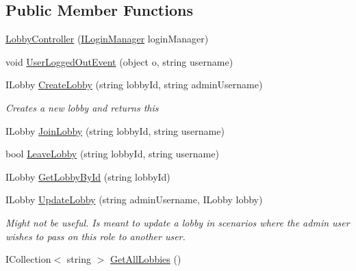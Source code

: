 \subsection*{Public Member Functions}
\begin{DoxyCompactItemize}
\item 
\mbox{\hyperlink{class_application_1_1_controllers_1_1_lobby_controller_a9c832739ad9b40794194b0f142279b6e}{Lobby\+Controller}} (\mbox{\hyperlink{interface_application_1_1_interfaces_1_1_i_login_manager}{I\+Login\+Manager}} login\+Manager)
\item 
void \mbox{\hyperlink{class_application_1_1_controllers_1_1_lobby_controller_a3b6eb2c76ba2d3d96ddec5c56ab2abc2}{User\+Logged\+Out\+Event}} (object o, string username)
\item 
I\+Lobby \mbox{\hyperlink{class_application_1_1_controllers_1_1_lobby_controller_ad0684f9eace44951fcb75c805fb8574c}{Create\+Lobby}} (string lobby\+Id, string admin\+Username)
\begin{DoxyCompactList}\small\item\em Creates a new lobby and returns this \end{DoxyCompactList}\item 
I\+Lobby \mbox{\hyperlink{class_application_1_1_controllers_1_1_lobby_controller_ac081cab03ea49323b57c294ca95c6a09}{Join\+Lobby}} (string lobby\+Id, string username)
\item 
bool \mbox{\hyperlink{class_application_1_1_controllers_1_1_lobby_controller_aa075018713d8ac7fdf84cf6349e2f10d}{Leave\+Lobby}} (string lobby\+Id, string username)
\item 
I\+Lobby \mbox{\hyperlink{class_application_1_1_controllers_1_1_lobby_controller_a5ea797c6456dc8d40e16b87077a16693}{Get\+Lobby\+By\+Id}} (string lobby\+Id)
\item 
I\+Lobby \mbox{\hyperlink{class_application_1_1_controllers_1_1_lobby_controller_a415b61b5c78ba52619ac4d3606ecc32e}{Update\+Lobby}} (string admin\+Username, I\+Lobby lobby)
\begin{DoxyCompactList}\small\item\em Might not be useful. Is meant to update a lobby in scenarios where the admin user wishes to pass on this role to another user. \end{DoxyCompactList}\item 
I\+Collection$<$ string $>$ \mbox{\hyperlink{class_application_1_1_controllers_1_1_lobby_controller_a1aec115271209fc4ea59ed5f790d3011}{Get\+All\+Lobbies}} ()
\item 

\end{DoxyCompactItemize}
